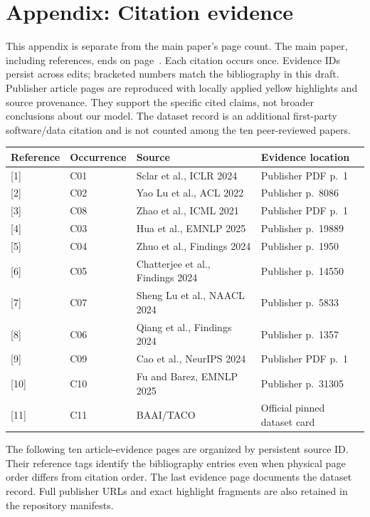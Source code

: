 \documentclass[conference,a4paper]{IEEEtran}
\begin{document}


\label{lastmainpage}

\clearpage
\onecolumn
\section*{Appendix: Citation evidence}
This appendix is separate from the main paper's page count. The main paper, including references, ends on page~\pageref{lastmainpage}. Each citation occurs once. Evidence IDs persist across edits; bracketed numbers match the bibliography in this draft. Publisher article pages are reproduced with locally applied yellow highlights and source provenance. They support the specific cited claims, not broader conclusions about our model. The dataset record is an additional first-party software/data citation and is not counted among the ten peer-reviewed papers.

\begin{center}
\small
\begin{tabular}{llll}
\toprule
Reference & Occurrence & Source & Evidence location\\
\midrule
{[1]} & C01 & Sclar et al., ICLR 2024 & Publisher PDF p.~1\\
{[2]} & C02 & Yao Lu et al., ACL 2022 & Publisher p.~8086\\
{[3]} & C08 & Zhao et al., ICML 2021 & Publisher PDF p.~1\\
{[4]} & C03 & Hua et al., EMNLP 2025 & Publisher p.~19889\\
{[5]} & C04 & Zhuo et al., Findings 2024 & Publisher p.~1950\\
{[6]} & C05 & Chatterjee et al., Findings 2024 & Publisher p.~14550\\
{[7]} & C07 & Sheng Lu et al., NAACL 2024 & Publisher p.~5833\\
{[8]} & C06 & Qiang et al., Findings 2024 & Publisher p.~1357\\
{[9]} & C09 & Cao et al., NeurIPS 2024 & Publisher PDF p.~1\\
{[10]} & C10 & Fu and Barez, EMNLP 2025 & Publisher p.~31305\\
{[11]} & C11 & BAAI/TACO & Official pinned dataset card\\
\bottomrule
\end{tabular}
\end{center}
The following ten article-evidence pages are organized by persistent source ID. Their reference tags identify the bibliography entries even when physical page order differs from citation order. The last evidence page documents the dataset record. Full publisher URLs and exact highlight fragments are also retained in the repository manifests.


\end{document}
